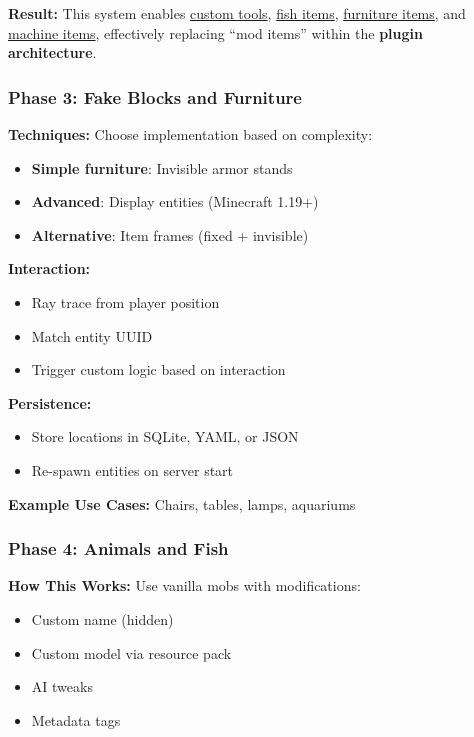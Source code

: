 \documentclass{article}
\begin{document}
\textbf{Result:}
This system enables \uline{custom tools}, \uline{fish items}, \uline{furniture items}, and \uline{machine items}, effectively replacing ``mod items'' within the \textbf{plugin architecture}.

\subsubsection{Phase 3: Fake Blocks and Furniture}

\textbf{Techniques:}
Choose implementation based on complexity:
\begin{itemize}
    \item \textbf{Simple furniture}: Invisible armor stands
    \item \textbf{Advanced}: Display entities (Minecraft 1.19+)
    \item \textbf{Alternative}: Item frames (fixed + invisible)
\end{itemize}

\textbf{Interaction:}
\begin{itemize}
    \item Ray trace from player position
    \item Match entity UUID
    \item Trigger custom logic based on interaction
\end{itemize}

\textbf{Persistence:}
\begin{itemize}
    \item Store locations in SQLite, YAML, or JSON
    \item Re-spawn entities on server start
\end{itemize}

\textbf{Example Use Cases:}
Chairs, tables, lamps, aquariums

\subsubsection{Phase 4: Animals and Fish}

\textbf{How This Works:}
Use vanilla mobs with modifications:
\begin{itemize}
    \item Custom name (hidden)
    \item Custom model via resource pack
    \item AI tweaks
    \item Metadata tags
\end{itemize}
\end{document}
